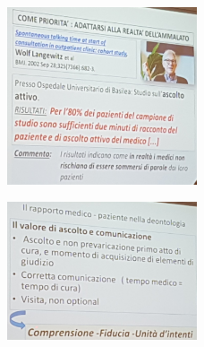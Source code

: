 \begin{figure}[!ht]
\centering
	\includegraphics[width=0.5\textwidth]{29/image5.jpeg}
	\end{figure}
	
	\begin{figure}[!ht]
\centering
	\includegraphics[width=0.5\textwidth]{29/image6.jpeg}
	\end{figure}

